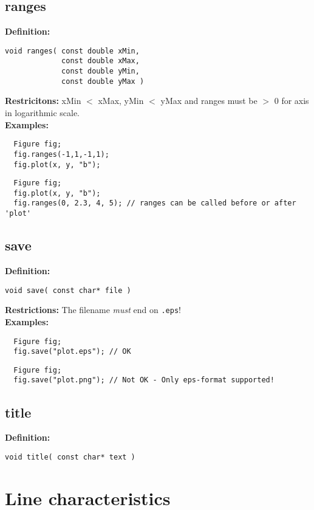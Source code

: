 \documentclass[a4paper]{article}
\newcommand{\command}[1]{\subsection{#1}}
\begin{document}
\command{ranges}

\textbf{Definition:}
\begin{lstlisting}
void ranges( const double xMin, 
             const double xMax, 
             const double yMin, 
             const double yMax )
\end{lstlisting}
%
\textbf{Restricitons:} xMin $<$ xMax, yMin $<$ yMax and ranges must be $>$ 0 for axis in logarithmic scale. \\
%
\textbf{Examples:}
\begin{lstlisting}
  Figure fig;
  fig.ranges(-1,1,-1,1);
  fig.plot(x, y, "b");
\end{lstlisting}
\begin{lstlisting}
  Figure fig;
  fig.plot(x, y, "b");
  fig.ranges(0, 2.3, 4, 5); // ranges can be called before or after 'plot'
\end{lstlisting}

\command{save}

\textbf{Definition:}
\begin{lstlisting}
void save( const char* file )
\end{lstlisting}
%
\textbf{Restrictions:} The filename \textit{must} end on \texttt{.eps}! \\
%
\textbf{Examples:}
\begin{lstlisting}
  Figure fig;
  fig.save("plot.eps"); // OK
\end{lstlisting}
\begin{lstlisting}
  Figure fig;
  fig.save("plot.png"); // Not OK - Only eps-format supported!
\end{lstlisting}

\command{title}

\textbf{Definition:}
\begin{lstlisting}
void title( const char* text )
\end{lstlisting}

\section{Line characteristics}
\end{document}
